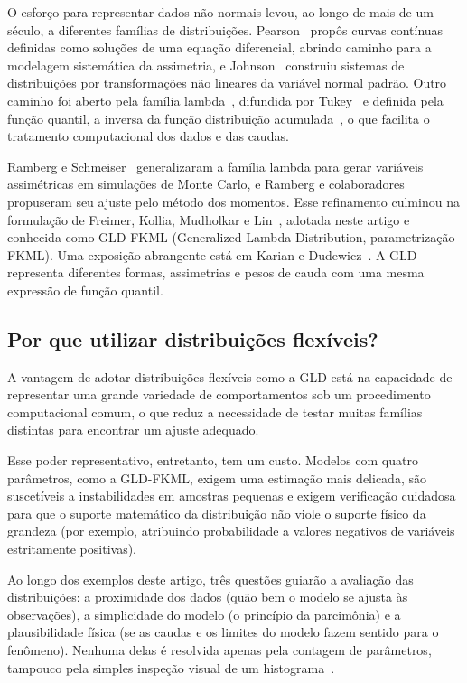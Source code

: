 O esforço para representar dados não normais levou, ao longo de mais de um século, a diferentes famílias de distribuições. Pearson~\cite{elderton1969} propôs curvas contínuas definidas como soluções de uma equação diferencial, abrindo caminho para a modelagem sistemática da assimetria, e Johnson~\cite{johnson1949} construiu sistemas de distribuições por transformações não lineares da variável normal padrão. Outro caminho foi aberto pela família lambda~\cite{hastings1947}, difundida por Tukey~\cite{tukey1960} e definida pela função quantil, a inversa da função distribuição acumulada~\cite{gilchrist2000}, o que facilita o tratamento computacional dos dados e das caudas.

Ramberg e Schmeiser~\cite{ramberg1974} generalizaram a família lambda para gerar variáveis assimétricas em simulações de Monte Carlo, e Ramberg e colaboradores~\cite{ramberg1979} propuseram seu ajuste pelo método dos momentos. Esse refinamento culminou na formulação de Freimer, Kollia, Mudholkar e Lin~\cite{freimer1988}, adotada neste artigo e conhecida como GLD-FKML (Generalized Lambda Distribution, parametrização FKML). Uma exposição abrangente está em Karian e Dudewicz~\cite{karian2011}. A GLD representa diferentes formas, assimetrias e pesos de cauda com uma mesma expressão de função quantil.

\subsection{Por que utilizar distribuições flexíveis?}

A vantagem de adotar distribuições flexíveis como a GLD está na capacidade de representar uma grande variedade de comportamentos sob um procedimento computacional comum, o que reduz a necessidade de testar muitas famílias distintas para encontrar um ajuste adequado.

Esse poder representativo, entretanto, tem um custo. Modelos com quatro parâmetros, como a GLD-FKML, exigem uma estimação mais delicada, são suscetíveis a instabilidades em amostras pequenas e exigem verificação cuidadosa para que o suporte matemático da distribuição não viole o suporte físico da grandeza (por exemplo, atribuindo probabilidade a valores negativos de variáveis estritamente positivas).

Ao longo dos exemplos deste artigo, três questões guiarão a avaliação das distribuições: a proximidade dos dados (quão bem o modelo se ajusta às observações), a simplicidade do modelo (o princípio da parcimônia) e a plausibilidade física (se as caudas e os limites do modelo fazem sentido para o fenômeno). Nenhuma delas é resolvida apenas pela contagem de parâmetros, tampouco pela simples inspeção visual de um histograma~\cite{nist2012}.

